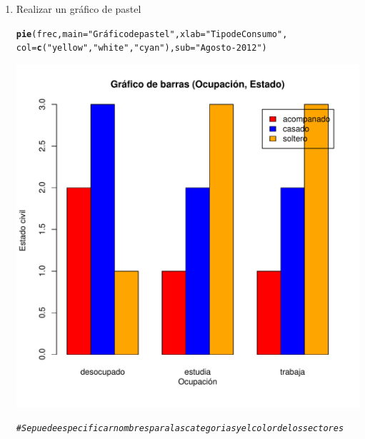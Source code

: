 \documentclass[12pt,letterpaper]{article}\usepackage[]{graphicx}\usepackage[]{color}
\makeatletter
\def\maxwidth{ %
  \ifdim\Gin@nat@width>\linewidth
    \linewidth
  \else
    \Gin@nat@width
  \fi
}
\newcommand{\hlstr}[1]{\textcolor[rgb]{0.192,0.494,0.8}{#1}}%
\newcommand{\hlcom}[1]{\textcolor[rgb]{0.678,0.584,0.686}{\textit{#1}}}%
\newcommand{\hlstd}[1]{\textcolor[rgb]{0.345,0.345,0.345}{#1}}%
\newcommand{\hlkwc}[1]{\textcolor[rgb]{0.333,0.667,0.333}{#1}}%
\newcommand{\hlkwd}[1]{\textcolor[rgb]{0.737,0.353,0.396}{\textbf{#1}}}%
\newenvironment{kframe}{%
 \def\at@end@of@kframe{}%
 \ifinner\ifhmode%
  \def\at@end@of@kframe{\end{minipage}}%
  \begin{minipage}{\columnwidth}%
 \fi\fi%
 \def\FrameCommand##1{\hskip\@totalleftmargin \hskip-\fboxsep
 \colorbox{shadecolor}{##1}\hskip-\fboxsep
     \hskip-\linewidth \hskip-\@totalleftmargin \hskip\columnwidth}%
 \MakeFramed {\advance\hsize-\width
   \@totalleftmargin\z@ \linewidth\hsize
   \@setminipage}}%
 {\par\unskip\endMakeFramed%
 \at@end@of@kframe}
\newenvironment{knitrout}{}{} %
\makeatother
\begin{document}
\begin{enumerate}
\item Realizar un gr\'afico de pastel 
\begin{knitrout}
\color{fgcolor}\begin{kframe}
\begin{alltt}
\hlkwd{pie}\hlstd{(frec,} \hlkwc{main}\hlstd{=}\hlstr{"Gráfico de pastel"}\hlstd{,} \hlkwc{xlab}\hlstd{=}\hlstr{"Tipo de Consumo"}\hlstd{,}
    \hlkwc{col}\hlstd{=}\hlkwd{c}\hlstd{(}\hlstr{"yellow"}\hlstd{,} \hlstr{"white"}\hlstd{,} \hlstr{"cyan"}\hlstd{),} \hlkwc{sub}\hlstd{=}\hlstr{"Agosto-2012"}\hlstd{)}
\end{alltt}
\end{kframe}
\includegraphics[width=\maxwidth]{figure/unnamed-chunk-13-1} 

\end{knitrout}
\begin{knitrout}
\color{fgcolor}\begin{kframe}
\begin{alltt}
\hlcom{# Se puede especificar nombres para las categorias y el color de los sectores}


\end{alltt}
\end{kframe}
\end{knitrout}
\end{enumerate}
\end{document}
